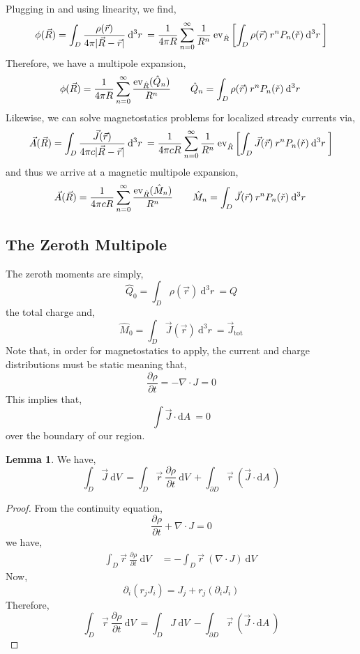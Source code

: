 \documentclass[12pt]{extarticle}
\renewcommand{\d}[1]{ \mathrm{d}#1 \:}
\newcommand{\dn}[2]{ \mathrm{d}^{#1} #2 \:}
\newcommand{\pderiv}[2]{\frac{\partial{#1}}{\partial{#2}}}
\theoremstyle{definition}
\newtheorem{lemma}[theorem]{Lemma}
\begin{document}
Plugging in and using linearity, we find,
\begin{align*}
\phi(\vec{R}) = \int_D \frac{\rho(\vec{r})}{4 \pi |\vec{R} - \vec{r}|} \: \dn{3}{r} =  \frac{1}{4 \pi R} \sum_{n = 0}^\infty  \frac{1}{R^n} \: \ev_{\hat{R}} \left[ \int_D \rho(\vec{r}) \: r^n P_n(\check{r}) \: \dn{3}{r} \right] 
\end{align*}
Therefore, we have a multipole expansion,
\[ \phi(\vec{R}) = \frac{1}{4 \pi R} \sum_{n = 0}^\infty \frac{\ev_{\hat{R}}(\hat{Q}_n)}{R^n} \quad \quad \hat{Q}_n = \int_D \rho(\vec{r}) \: r^n P_n(\check{r}) \: \dn{3}{r} \]
Likewise, we can solve magnetostatics problems for localized stready currents via,
\[ \vec{A}(\vec{R}) = \int_D \frac{\vec{J}(\vec{r})}{4 \pi c |\vec{R} - \vec{r}|} \: \dn{3}{r} =  \frac{1}{4 \pi c R} \sum_{n = 0}^\infty  \frac{1}{R^n} \: \ev_{\hat{R}} \left[ \int_D \vec{J}(\vec{r}) \: r^n P_n(\check{r}) \: \dn{3}{r} \right]  \]
and thus we arrive at a magnetic multipole expansion,
\[ \vec{A}(\vec{R}) = \frac{1}{4 \pi c R} \sum_{n = 0}^\infty \frac{\ev_{\hat{R}}(\hat{M}_n)}{R^n} \quad \quad \hat{M}_n = \int_D \vec{J}(\vec{r}) \: r^n P_n(\check{r}) \: \dn{3}{r} \]

\subsection{The Zeroth Multipole}

The zeroth moments are simply,
\[ \hat{Q}_0 = \int_D \rho(\vec{r}) \: \dn{3}{r} = Q \]
the total charge and,
\[ \hat{M}_0 = \int_D \vec{J}(\vec{r}) \: \dn{3}{r} = \vec{J}_{\text{tot}} \]
Note that, in order for magnetostatics to apply, the current and charge distributions must be static meaning that,
\[ \pderiv{\rho}{t} = - \nabla \cdot J = 0 \]
This implies that,
\[ \int \vec{J} \cdot \d{A} = 0 \]
over the boundary of our region. 

\begin{lemma}
We have,
\[ \int_D \vec{J}  \: \d{V} = \int_D \vec{r} \: \pderiv{\rho}{t} \: \d{V} + \int_{\partial D} \vec{r} \: (\vec{J} \cdot \d{A}) \]
\end{lemma}

\begin{proof}
From the continuity equation,
\[ \pderiv{\rho}{t} + \nabla \cdot J = 0 \]
we have,
\begin{align*}
\int_D \vec{r} \: \pderiv{\rho}{t} \: \d{V} & = - \int_D \vec{r} \: (\nabla \cdot J) \: \d{V} 
\end{align*}
Now,
\[ \partial_i (r_j J_i) = J_j + r_j (\partial_i J_i) \]
Therefore,
\[ \int_D \vec{r} \: \pderiv{\rho}{t} \: \d{V}  = \int_D J \; \d{V} - \int_{\partial D} \vec{r} \: (\vec{J} \cdot \d{A}) \]
\end{proof}
\end{document}
